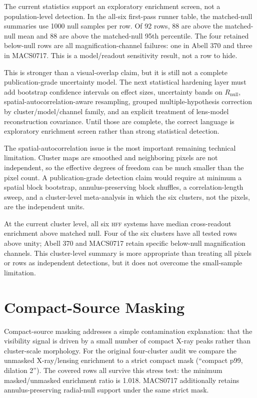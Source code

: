 \documentclass[11pt,a4paper]{article}
\newcommand{\HFF}{\textsc{hff}}
\begin{document}
The current statistics support an exploratory enrichment screen, not a
population-level detection. In the all-six first-pass runner table, the
matched-null summaries use 1000 null samples per row. Of 92 rows, 88 are above
the matched-null mean and 88 are above the matched-null 95th percentile. The
four retained below-null rows are all magnification-channel failures: one in
Abell 370 and three in MACS0717. This is a model/readout sensitivity result, not
a row to hide.

This is stronger than a visual-overlap claim, but it is still not a complete
publication-grade uncertainty model. The next statistical hardening layer must
add bootstrap confidence intervals on effect sizes, uncertainty bands on
$R_{\mathrm{null}}$, spatial-autocorrelation-aware resampling, grouped
multiple-hypothesis correction by cluster/model/channel family, and an explicit
treatment of lens-model reconstruction covariance. Until those are complete,
the correct language is exploratory enrichment screen rather than strong
statistical detection.

The spatial-autocorrelation issue is the most important remaining technical
limitation. Cluster maps are smoothed and neighboring pixels are not
independent, so the effective degrees of freedom can be much smaller than the
pixel count. A publication-grade detection claim would require at minimum a
spatial block bootstrap, annulus-preserving block shuffles, a correlation-length
sweep, and a cluster-level meta-analysis in which the six clusters, not the
pixels, are the independent units.

At the current cluster level, all six \HFF{} systems have median
cross-readout enrichment above matched null. Four of the six clusters have
all tested rows above unity; Abell 370 and MACS0717 retain specific below-null
magnification channels. This cluster-level summary is more
appropriate than treating all pixels or rows as independent detections, but it
does not overcome the small-sample limitation.

\section{Compact-Source Masking}

Compact-source masking addresses a simple contamination explanation: that the
visibility signal is driven by a small number of compact X-ray peaks rather than
cluster-scale morphology. For the original four-cluster audit we compare the
unmasked X-ray/lensing enrichment to a strict compact mask (``compact p99,
dilation 2''). The covered rows all survive this stress test: the minimum
masked/unmasked enrichment ratio is 1.018. MACS0717 additionally retains
annulus-preserving radial-null support under the same strict mask.
\end{document}
